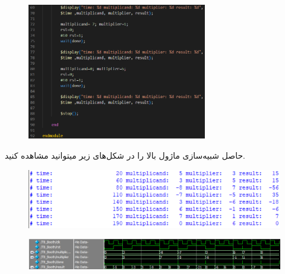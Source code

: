 \documentclass{article}
\begin{document}
\begin{figure}[H]
    \centering
    \includegraphics[width=0.7\textwidth]{TB_Booth3.png}
\end{figure}

حاصل شبیه‌سازی ماژول بالا را در شکل‌های زیر میتوانید مشاهده کنید.

\begin{figure}[H]
    \centering
    \includegraphics[width=\textwidth]{Res1.png}
\end{figure}

\begin{figure}[H]
    \centering
    \includegraphics[width=\textwidth]{Res2.png}
\end{figure}
\end{document}
